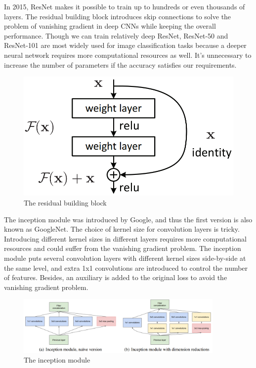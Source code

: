 In 2015, ResNet makes it possible to train up to hundreds or even thousands of layers. The residual building block introduces skip connections to solve the problem of vanishing gradient in deep CNNs while keeping the overall performance. Though we can train relatively deep ResNet, ResNet-50 and ResNet-101 are most widely used for image classification tasks because a deeper neural network requires more computational resources as well. It's unnecessary to increase the number of parameters if the accuracy satisfies our requirements.

\begin{figure}[H]
\centering
\includegraphics[scale=0.35]{figures/chapter_classification/resnet.png}
\caption{The residual building block}
\label{fig.res_net}
\end{figure}

The inception module was introduced by Google, and thus the first version is also known as GoogleNet. The choice of kernel size for convolution layers is tricky. Introducing different kernel sizes in different layers requires more computational resources and could suffer from the vanishing gradient problem. The inception module puts several convolution layers with different kernel sizes side-by-side at the same level, and extra 1x1 convolutions are introduced to control the number of features. Besides, an auxiliary is added to the original loss to avoid the vanishing gradient problem.

\begin{figure}[H]
\centering
\includegraphics[width=0.9\textwidth]{figures/chapter_classification/inception.png}
\caption{The inception module}
\label{fig.inception}
\end{figure}

